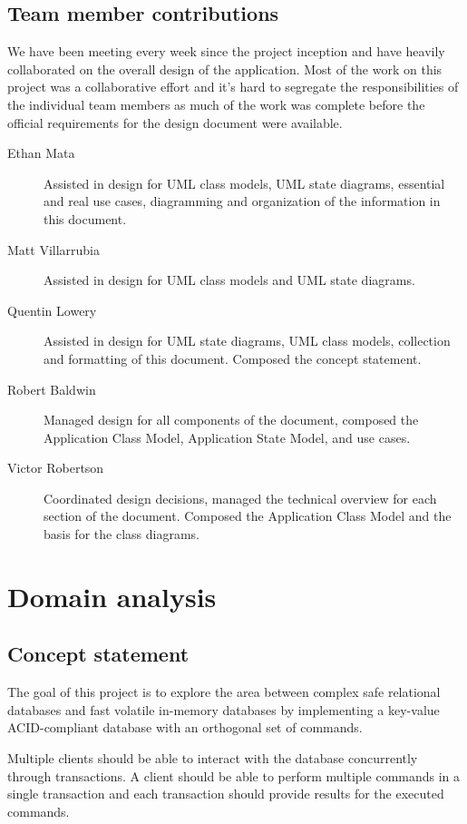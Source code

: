 \documentclass[a4paper]{report}
\begin{document}
\section[Contributors]{Team member contributions}

	We have been meeting every week since the project inception and have heavily collaborated on the overall design of the application. Most of the work on this project was a collaborative effort and it's hard to segregate the responsibilities of the individual team members as much of the work was complete before the official requirements for the design document were available.

	\begin{description}
		\item[Ethan Mata] Assisted in design for UML class models, UML state diagrams, essential and real use cases, diagramming and organization of the information in this document.
		\item[Matt Villarrubia] Assisted in design for UML class models and UML state diagrams.
		\item[Quentin Lowery] Assisted in design for UML state diagrams, UML class models, collection and formatting of this document. Composed the concept statement.
		\item[Robert Baldwin] Managed design for all components of the document, composed the Application Class Model, Application State Model, and use cases.
		\item[Victor Robertson] Coordinated design decisions, managed the technical overview for each section of the document. Composed the Application Class Model and the basis for the class diagrams.
	\end{description}

\chapter{Domain analysis}

\section{Concept statement}

	The goal of this project is to explore the area between complex safe relational databases and fast volatile in-memory databases by implementing a key-value ACID-compliant database with an orthogonal set of commands.

	Multiple clients should be able to interact with the database concurrently through transactions. A client should be able to perform multiple commands in a single transaction and each transaction should provide results for the executed commands.
\end{document}
